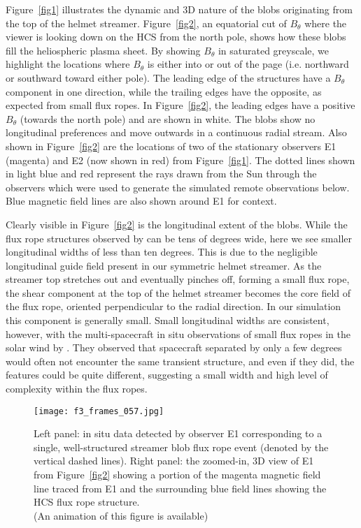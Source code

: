 \documentclass[preprint]{aastex62}
\begin{document}
Figure~\ref{fig1} {illustrates} the dynamic and 3D nature of the blobs
originating from the top of the helmet streamer. 
%
{Figure~\ref{fig2}, an equatorial cut of $B_\theta$ where the viewer is looking
down on the HCS from the north pole, shows how these blobs fill the heliospheric plasma sheet.}
%
By showing $B_\theta$ in
saturated greyscale, we highlight the locations where $B_\theta$
is either into or out of the page (i.e. northward or southward
toward either pole). The leading edge of the structures have a $B_\theta$ component in
one direction, while the trailing edges have the opposite, as expected from small flux ropes. In
Figure~\ref{fig2}, the leading edges have a positive $B_\theta$
(towards the north pole) and are shown in white. The blobs show no
longitudinal preferences and move outwards in a continuous radial
stream. Also shown in Figure~\ref{fig2} are the locations of two
of the stationary observers E1 (magenta) and E2 (now shown in red)
from Figure~\ref{fig1}. The dotted lines shown in light blue and
red represent the rays drawn from the Sun through the observers
which were used to generate the simulated remote observations below.
Blue magnetic field lines are also shown around E1 for context.

Clearly visible in Figure~\ref{fig2} is the longitudinal extent of
the blobs. While the flux rope structures observed by \citet{Sheeley2009}
can be tens of degrees wide, here we see smaller longitudinal widths
of less than ten degrees. This is due to the negligible longitudinal guide field
present in our symmetric helmet streamer. As the streamer top
stretches out and eventually pinches off, forming a small flux rope,
the shear component at the top of the helmet streamer becomes the
core field of the flux rope, oriented perpendicular to the radial
direction. In our simulation this component is generally small.
Small longitudinal widths are consistent, however, with the
multi-spacecraft in situ observations of small flux ropes in the
solar wind by \citet{Kilpua2009b}. They observed that spacecraft
separated by only a few degrees would often not encounter the same
transient structure, and even if they did, the features could be
quite different, suggesting a small width and high level of complexity
within the flux ropes.



\begin{figure*}
	\texttt{[image: f3\_frames\_057.jpg]}
	\caption{Left panel: in situ data detected by observer E1
	corresponding to a single, well-structured streamer blob
	flux rope event (denoted by the vertical dashed lines).
	Right panel: the zoomed-in, 3D view of E1 from Figure~\ref{fig2}
	showing a portion of the magenta magnetic field line traced
	from E1 and the surrounding blue field lines showing the
	HCS flux rope structure.  \\ (An animation of this figure
	is available)\\ }
	\label{fig3}
\end{figure*}
\end{document}
